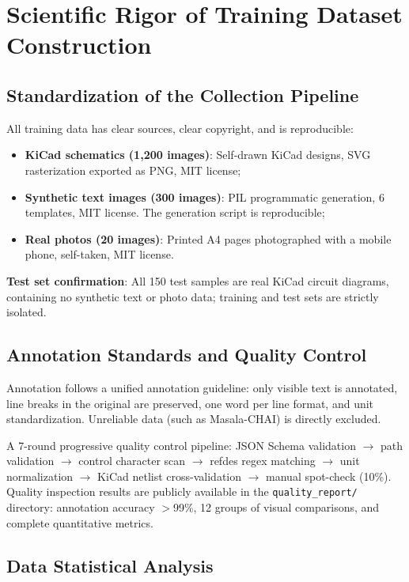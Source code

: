 \section{Scientific Rigor of Training Dataset Construction}

\subsection{Standardization of the Collection Pipeline}

All training data has clear sources, clear copyright, and is reproducible:

\begin{itemize}[nosep]
    \item \textbf{KiCad schematics (1,200 images)}: Self-drawn KiCad designs, SVG rasterization exported as PNG, MIT license;
    \item \textbf{Synthetic text images (300 images)}: PIL programmatic generation, 6 templates, MIT license. The generation script is reproducible;
    \item \textbf{Real photos (20 images)}: Printed A4 pages photographed with a mobile phone, self-taken, MIT license.
\end{itemize}

\textbf{Test set confirmation}: All 150 test samples are real KiCad circuit diagrams, containing no synthetic text or photo data; training and test sets are strictly isolated.

\subsection{Annotation Standards and Quality Control}

Annotation follows a unified annotation guideline: only visible text is annotated, line breaks in the original are preserved, one word per line format, and unit standardization. Unreliable data (such as Masala-CHAI) is directly excluded.

A 7-round progressive quality control pipeline: JSON Schema validation $\to$ path validation $\to$ control character scan $\to$ refdes regex matching $\to$ unit normalization $\to$ KiCad netlist cross-validation $\to$ manual spot-check (10\%). Quality inspection results are publicly available in the \texttt{quality\_report/} directory: annotation accuracy $>$99\%, 12 groups of visual comparisons, and complete quantitative metrics.

\subsection{Data Statistical Analysis}

